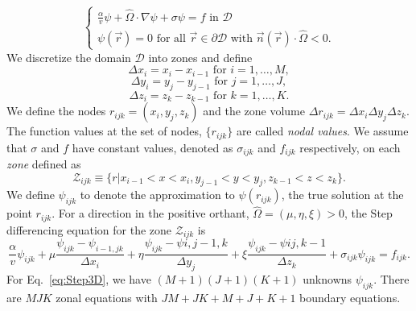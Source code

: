 \begin{equation}
\begin{cases}
	\frac{\alpha}{v} \psi + \hat{\Omega} \cdot \nabla \psi + \sigma \psi = f \text{ in } \mathcal{D} \\
	\psi(\vec{r}) = 0 \text{ for all } \vec{r} \in \partial \mathcal{D} \text { with } \vec{n}(\vec{r}) \cdot \hat{\Omega} < 0.
\end{cases}
\end{equation}
We discretize the domain $\mathcal{D}$ into zones and define
\begin{equation}
	\Delta x_{i} = x_{i} - x_{i-1} \text{ for } i = 1, \dots, M,
\end{equation}
\begin{equation}
	\Delta y_{i} = y_{j} - y_{j-1} \text{ for } j = 1, \dots, J,
\end{equation}
\begin{equation}
	\Delta z_{i} = z_{k} - z_{k-1} \text{ for } k = 1, \dots, K.
\end{equation}
We define the nodes $r_{ijk} = (x_{i}, y_{j}, z_{k})$ and the zone volume $\Delta r_{ijk} = \Delta x_{i} \Delta y_{j} \Delta z_{k}$. The function values at the set of nodes, $\{r_{ijk}\}$ are called \textit{nodal values}. We assume that $\sigma$ and $f$ have constant values, denoted as $\sigma_{ijk}$ and $f_{ijk}$ respectively, on each \textit{zone} defined as
\begin{equation}
	\mathcal{Z}_{ijk} \equiv \{ r \vert x_{i-1} < x < x_{i}, y_{j-1} < y < y_{j}, z_{k-1} < z < z_{k} \}.
\end{equation}
We define $\psi_{ijk}$ to denote the approximation to $\psi(r_{ijk})$, the true solution at the point $r_{ijk}$. For a direction in the positive orthant, $\hat{\Omega} = (\mu, \eta, \xi) > 0$, the Step differencing equation for the zone $\mathcal{Z}_{ijk}$ is
\begin{equation}
	\frac{\alpha}{v} \psi_{ijk} + \mu \frac{\psi_{ijk} - \psi_{i-1,jk}}{\Delta x_{i}} + \eta \frac{\psi_{ijk} - \psi{i,j-1,k}}{\Delta y_{j}} + \xi \frac{\psi_{ijk} - \psi{ij,k-1}}{\Delta z_{k}} + \sigma_{ijk} \psi_{ijk} = f_{ijk}.
	\label{eq:Step3D}
\end{equation}
For Eq.~\ref{eq:Step3D}, we have $(M+1)(J+1)(K+1)$ unknowns $\psi_{ijk}$. There are $MJK$ zonal equations with $JM + JK + M + J + K + 1$ boundary equations.

